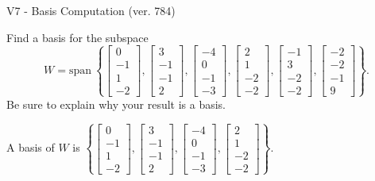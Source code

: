 \begin{exercise}
  \begin{exerciseTitle}V7 - Basis Computation (ver. 784)\end{exerciseTitle}
  \begin{exerciseStatement}
    Find a basis for the subspace 
\[W=\mathrm{span}\ \left\{\left[\begin{array}{r}
0 \\
-1 \\
1 \\
-2
\end{array}\right] , \left[\begin{array}{r}
3 \\
-1 \\
-1 \\
2
\end{array}\right] , \left[\begin{array}{r}
-4 \\
0 \\
-1 \\
-3
\end{array}\right] , \left[\begin{array}{r}
2 \\
1 \\
-2 \\
-2
\end{array}\right] , \left[\begin{array}{r}
-1 \\
3 \\
-2 \\
-2
\end{array}\right] , \left[\begin{array}{r}
-2 \\
-2 \\
-1 \\
9
\end{array}\right]\right\}.\]
 Be sure to explain why your result is a basis.


  \end{exerciseStatement}
  \begin{exerciseAnswer}
   A basis of \(W\) is  \(\left\{\left[\begin{array}{r}
0 \\
-1 \\
1 \\
-2
\end{array}\right] , \left[\begin{array}{r}
3 \\
-1 \\
-1 \\
2
\end{array}\right] , \left[\begin{array}{r}
-4 \\
0 \\
-1 \\
-3
\end{array}\right] , \left[\begin{array}{r}
2 \\
1 \\
-2 \\
-2
\end{array}\right]\right\}\).
  


  \end{exerciseAnswer}
\end{exercise}